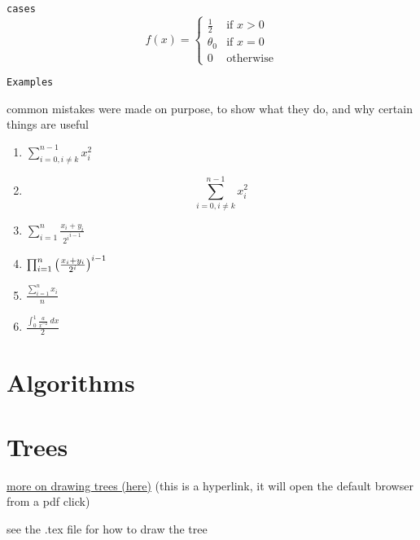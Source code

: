 \documentclass[11pt, oneside]{article}   	%
\begin{document}
\texttt{cases}
\[
f(x) = \begin{cases}
    \frac{1}{2} &\text{if } x > 0 \\
    \theta_0    &\text{if } x = 0 \\
    0           &\text{otherwise}
\end{cases}
\]

\newpage
\begin{center}
\texttt{Examples}

\tiny{common mistakes were made on purpose, to show what they do, and why certain things are useful}
\end{center}
\begin{enumerate}[(1)]
    \item $\sum_{i=0,i\ne k}^{n-1} x_i^2$
    \item \[\sum_{i=0,i\ne k}^{n-1} x_i^2\]
    \item $\sum_{i=1}^n \frac{x_i+y_i}{{2^i}^{i-1}}$
    \item $\prod_{i=1}^n \left( \frac{x_i+y_i}{2^i} \right)^{i-1}$
    \item $\frac{\sum_{i=1}^n x_i}{n}$
    \item $\frac{\int_0^1 \frac{a}{x^{-2}} \ dx}{2}$
\end{enumerate}




\newpage


\section{Algorithms} \noindent

\section{Trees} \noindent

\hyperlink{https://tikz.dev/tikz-trees}{more on drawing trees (here)} (this is a hyperlink, it will open the default browser from a pdf click)

see the .tex file for how to draw the tree

\begin{center}
    \end{center}
\end{document}

